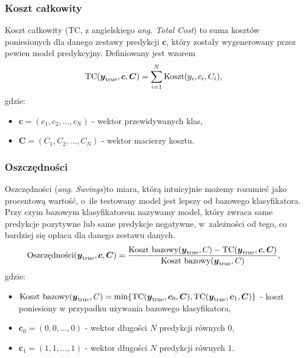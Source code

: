 \documentclass[inzynierska]{pwr_wmat_praca_dyplomowa}
\theoremstyle{plain}
\numberwithin{theorem}{chapter}
\theoremstyle{definition}
\numberwithin{theorem}{chapter}
\begin{document}
\subsubsection{Koszt całkowity}
Koszt całkowity (TC, z angielskiego \textit{ang. Total Cost}) to suma kosztów poniesionych dla danego zestawy predykcji $\boldsymbol{c}$, który zostały wygenerowany przez pewien model predykcyjny. Definiowany jest wzorem
\begin{equation}
\label{koszt-calkowity}
\text{TC}(\boldsymbol{y}_{\text{true}}, \boldsymbol{c}, \boldsymbol{C}) = \sum_{i=1}^{N}\text{Koszt}(y_i, c_i, C_i) \text{,}
\end{equation} 
gdzie:
\begin{itemize}
	\item $\boldsymbol{c} = (c_1, c_2, \dots, c_N) $ - wektor przewidywanych klas,
	\item $\boldsymbol{C} = (C_1, C_2, \dots, C_N) $ - wektor macierzy kosztu.
\end{itemize}

\subsubsection{Oszczędności}
Oszczędności (\textit{ang. Savings})to miara, którą intuicyjnie możemy rozumieć jako procentową wartość, o~ile testowany model jest lepszy od bazowego klasyfikatora. Przy czym bazowym klasyfikatorem nazywamy model, który zwraca same predykcje pozytywne lub same predykcje negatywne, w~zależności od tego, co bardziej się opłaca dla danego zestawu danych.
\begin{equation}
\text{Oszczędności}(\boldsymbol{y}_{\text{true}}, \boldsymbol{c}, \boldsymbol{C}) = \frac{\text{Koszt bazowy}(\boldsymbol{y}_{\text{true}}, C) - \text{TC}(\boldsymbol{y}_{\text{true}}, \boldsymbol{c}, \boldsymbol{C})}{\text{Koszt bazowy}(\boldsymbol{y}_{\text{true}}, C)} \text{,}
\end{equation}
gdzie:
\begin{itemize}
	\item $ \text{Koszt bazowy}(\boldsymbol{y}_{\text{true}}, C) = \min\{\text{TC}(\boldsymbol{y}_{\text{true}}, \boldsymbol{c}_0, \boldsymbol{C}), \text{TC}(\boldsymbol{y}_{\text{true}}, \boldsymbol{c}_1, \boldsymbol{C})\}$ - koszt poniesiony w przypadku używania bazowego klasyfikatora,
	\item $\boldsymbol{c}_0 = (0, 0, \dots, 0)$ - wektor długości $N$ predykcji równych $0$,
	\item $\boldsymbol{c}_1 = (1, 1, \dots, 1)$ - wektor długości $N$ predykcji równych $1$.
\end{itemize}{}
\end{document}
